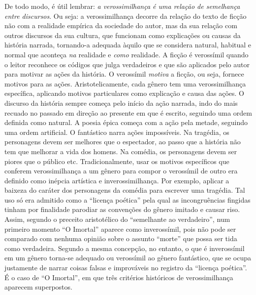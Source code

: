 De todo modo, é útil lembrar: \emph{a verossimilhança é uma relação de
semelhança entre discursos}. Ou seja: a verossimilhança decorre da
relação do texto de ficção não com a realidade empírica da sociedade do
autor, mas da sua relação com outros discursos da sua cultura, que
funcionam como explicações ou causas da história narrada, tornando-a
adequada àquilo que se considera natural, habitual e normal que aconteça
\emph{na} realidade e \emph{como} realidade. A ficção é verossímil
quando o leitor reconhece os códigos que julga verdadeiros e que são
aplicados pelo autor para motivar as ações da história. O verossímil
\emph{motiva} a ficção, ou seja, fornece motivos para as ações.
Aristotelicamente, cada gênero tem uma verossimilhança específica,
aplicando motivos particulares como explicação e causa das ações. O
discurso da história sempre começa pelo início da ação narrada, indo do
mais recuado no passado em direção ao presente em que é escrito,
seguindo uma ordem definida como natural. A poesia épica começa com a
ação pela metade, seguindo uma ordem artificial. O fantástico narra
ações impossíveis. Na tragédia, os personagens devem ser melhores que o
espectador, ao passo que a história não tem que melhorar a vida dos
homens. Na comédia, os personagens devem ser piores que o público etc.
Tradicionalmente, usar os motivos específicos que conferem
verossimilhança a um gênero para compor o verossímil de outro era
definido como inépcia artística e inverossimilhança. Por exemplo,
aplicar a baixeza do caráter dos personagens da comédia para escrever
uma tragédia. Tal uso só era admitido como a ``licença poética'' pela qual
as incongruências fingidas tinham por finalidade parodiar as convenções
do gênero imitado e causar riso. Assim, segundo o preceito aristotélico
do ``semelhante ao verdadeiro'', num primeiro momento ``O Imortal'' aparece
como inverossímil, pois não pode ser comparado com nenhuma opinião sobre
o assunto ``morte'' que possa ser tida como verdadeira. Segundo a mesma
concepção, no entanto, o que é inverossímil em um gênero torna-se
adequado ou verossímil ao gênero fantástico, que se ocupa justamente de
narrar coisas falsas e improváveis no registro da ``licença poética''. É o
caso de ``O Imortal'', em que três critérios históricos de verossimilhança
aparecem superpostos.

